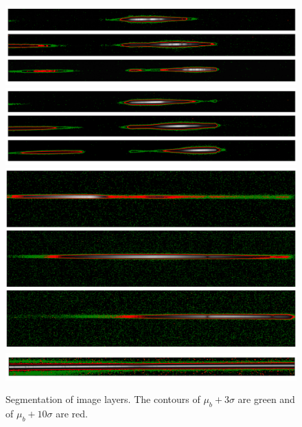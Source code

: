 \documentclass[10pt,a4paper,notitlepage]{article}
\begin{document}
	
	\begin{figure}[h]
		\includegraphics[width=\columnwidth]{img/alpori_segm.png} \\
		\includegraphics[width=\columnwidth]{img/betori_segm.png} \\
		\includegraphics[width=\columnwidth]{img/alpcma_segm.png} \\
		\includegraphics[width=\columnwidth]{img/alpleo_segm.png}		
		\caption[segmentation]%
		{Segmentation of image layers.
			The contours of $\mu_b + 3 \sigma$ are green and of $\mu_b + 10 \sigma$ are red.}
		\label{fig:segmentation}
	\end{figure}
\end{document}
